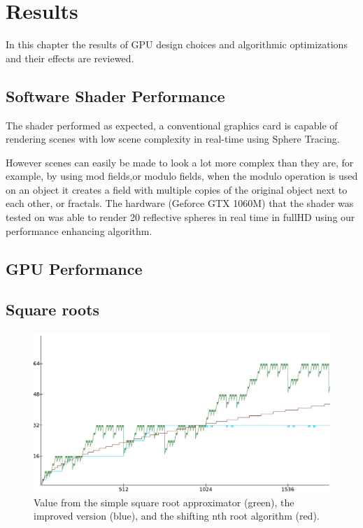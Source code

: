 \chapter{Results}

	In this chapter the results of GPU design choices and algorithmic optimizations
	and their effects are reviewed.

	\section{Software Shader Performance}

		The shader performed as expected, a conventional graphics card is 
		capable of rendering scenes with low scene complexity in real-time
		using Sphere Tracing.

		However scenes can easily be made to look a lot more complex than they 
		are, for example, by using mod fields,or modulo fields, when the modulo 
		operation is used on an object it creates a field with multiple copies 
		of the original object next to each other, or fractals. The hardware 
		(Geforce GTX 1060M) that the shader was tested on was able to render 
		20 reflective spheres in real time in fullHD using our performance enhancing 
		algorithm.


	\section{GPU Performance}
	
	\section{Square roots}

		\begin{figure}[H]
			\centering
			\includegraphics[width=0.75\linewidth]{figure/value12x.png} 
			\caption{Value from the simple square root approximator (green),
				the improved version (blue), and the shifting nth root 
				algorithm (red).}
			\label{orsqrt2}
		\end{figure}


